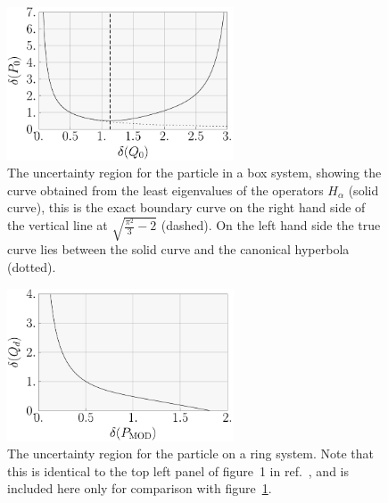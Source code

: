 \begin{figure}[ht]
  \centering
  \includegraphics[width=0.6\textwidth]{box-ur}  
  \caption{The uncertainty region for the particle in a box system, showing the curve obtained from the least eigenvalues of the operators $H_\alpha$ (solid curve), this is the exact boundary curve on the right hand side of the vertical line at $\sqrt{\frac{\pi^2}{3} -2}$ (dashed). On the left hand side the true curve lies between the solid curve and the canonical hyperbola (dotted).}
  \label{fig:box-ur}
\end{figure}

\begin{figure}[ht]
  \centering
  \includegraphics[width=0.6\textwidth]{ring-ur}  
  \caption{The uncertainty region for the particle on a ring system. Note that this is identical to the top left panel of figure~1 in ref.~\cite{sharp-ur-num-angle}, and is included here only for comparison with figure~\ref{fig:box-ur}.}
  \label{fig:ring-ur}
\end{figure}
